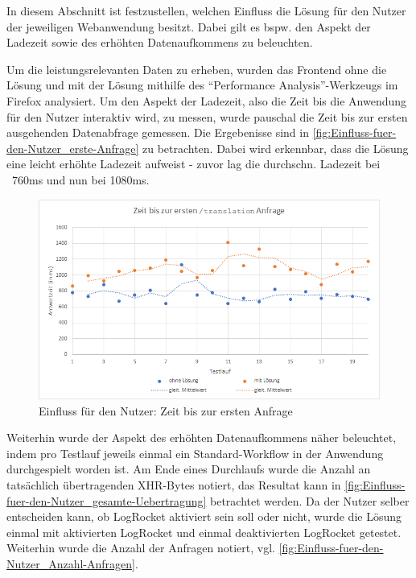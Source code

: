 
In diesem Abschnitt ist festzustellen, welchen Einfluss die Lösung für den Nutzer der jeweiligen Webanwendung besitzt. Dabei gilt es bspw. den Aspekt der Ladezeit sowie des erhöhten Datenaufkommens zu beleuchten.

Um die leistungsrelevanten Daten zu erheben, wurden das Frontend ohne die Lösung und mit der Lösung mithilfe des \enquote{Performance Analysis}-Werkzeugs im Firefox \cite{FirefoxPerformanceAnalysis} analysiert. Um den Aspekt der Ladezeit, also die Zeit bis die Anwendung für den Nutzer interaktiv wird, zu messen, wurde pauschal die Zeit bis zur ersten ausgehenden Datenabfrage gemessen. Die Ergebenisse sind in \autoref{fig:Einfluss-fuer-den-Nutzer_erste-Anfrage} zu betrachten. Dabei wird erkennbar, dass die Lösung eine leicht erhöhte Ladezeit aufweist - zuvor lag die durchschn. Ladezeit bei ~760ms und nun bei 1080ms.

\begin{figure}[H]
	\centering
	\includegraphics[width=1.00\linewidth]{data/Einfluss-fuer-den-Nutzer/Einfluss-fuer-den-Nutzer_erste-Anfrage.png}
	\caption{Einfluss für den Nutzer: Zeit bis zur ersten Anfrage}
	\label{fig:Einfluss-fuer-den-Nutzer_erste-Anfrage}
\end{figure}

Weiterhin wurde der Aspekt des erhöhten Datenaufkommens näher beleuchtet, indem pro Testlauf jeweils einmal ein Standard-Workflow in der Anwendung durchgespielt worden ist. Am Ende eines Durchlaufs wurde die Anzahl an tatsächlich\footnotemark{} übertragenden XHR-Bytes notiert, das Resultat kann in  \autoref{fig:Einfluss-fuer-den-Nutzer_gesamte-Uebertragung} betrachtet werden. Da der Nutzer selber entscheiden kann, ob LogRocket aktiviert sein soll oder nicht, wurde die Lösung einmal mit aktivierten LogRocket und einmal deaktivierten LogRocket getestet. Weiterhin wurde die Anzahl der Anfragen notiert, vgl. \autoref{fig:Einfluss-fuer-den-Nutzer_Anzahl-Anfragen}.

